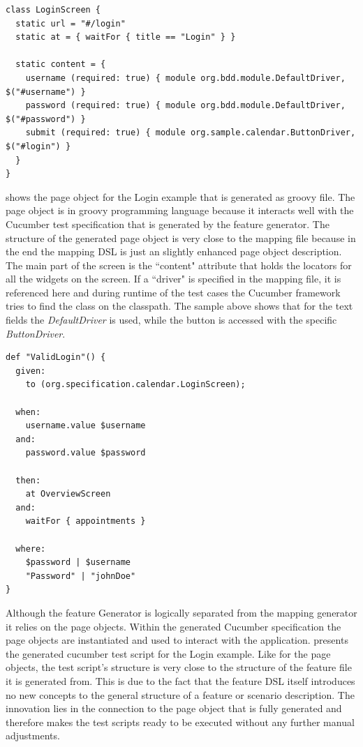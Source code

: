 \documentclass{sig-alternate-05-2015}
\begin{document}
\begin{lstlisting}[captionpos=b, caption=Generated Page Object, label={lst:MappingGenerated}, language=dsl]
class LoginScreen {
  static url = "#/login"
  static at = { waitFor { title == "Login" } }
	
  static content = {
	username (required: true) { module org.bdd.module.DefaultDriver, $("#username") }
	password (required: true) { module org.bdd.module.DefaultDriver, $("#password") }
	submit (required: true) { module org.sample.calendar.ButtonDriver, $("#login") }
  }
}
\end{lstlisting}

 shows the page object for the Login example that is generated as groovy file.
The page object is in groovy programming language because it interacts well with the Cucumber test specification that is generated by the feature generator.
The structure of the generated page object is very close to the mapping file because in the end the mapping DSL is just an slightly enhanced page object description.
The main part of the screen is the ``content" attribute that holds the locators for all the widgets on the screen.
If a ``driver" is specified in the mapping file, it is referenced here and during runtime of the test cases the Cucumber framework tries to find the class on the classpath.
The sample above shows that for the text fields the \textit{DefaultDriver} is used, while the button is accessed with the specific \textit{ButtonDriver}.

\begin{lstlisting}[captionpos=b, caption=Generated Feature File, label={lst:featureGenerated}, language=dsl]
def "ValidLogin"() {
  given:
	to (org.specification.calendar.LoginScreen);

  when:
	username.value $username
  and:
	password.value $password

  then:
	at OverviewScreen
  and:
	waitFor { appointments }

  where:
	$password | $username	
	"Password" | "johnDoe"
}
\end{lstlisting}

Although the feature Generator is logically separated from the mapping generator it relies on the page objects.
Within the generated Cucumber specification the page objects are instantiated and used to interact with the application.
 presents the generated cucumber test script for the Login example. 
Like for the page objects, the test script's structure is very close to the structure of the feature file it is generated from.
This is due to the fact that the feature DSL itself introduces no new concepts to the general structure of a feature or scenario description.
The innovation lies in the connection to the page object that is fully generated and therefore makes the test scripts ready to be executed without any further manual adjustments.
\end{document}
